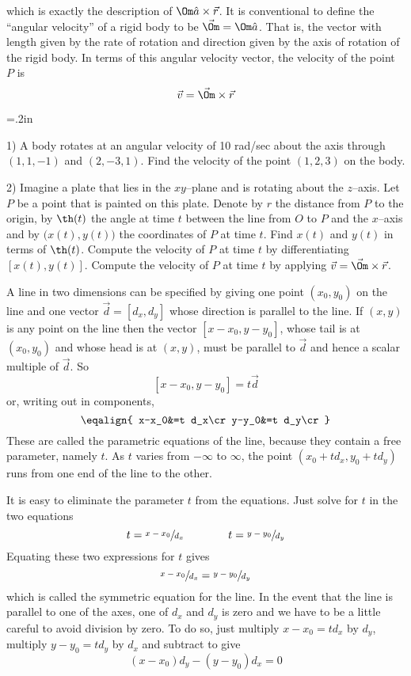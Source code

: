 \goodbreak\noindent
which is exactly the description of $\Om\hat a\times\vec r$. It is conventional
to define the ``angular velocity'' of a rigid body to be $\vec \Om=\Om\hat a$. That
is, the vector with length given by the rate of rotation and direction
given by the axis of rotation of the rigid body. In terms of this angular 
velocity vector, the velocity of the point $P$ is
$$
\vec v=\vec\Om\times\vec r
$$
{\parindent=.2in
\item{1)} A body rotates at an angular velocity of 10 rad/sec about the
axis through $(1,1,-1)$ and $(2,-3,1)$. Find the velocity of the point $(1,2,3)$ on the body.
\smallskip
\item{2)} Imagine a plate that lies in the $xy$--plane and is rotating
about the $z$--axis. Let $P$ be a point that is painted on this plate.
Denote by $r$ the distance from $P$ to the origin, by $\th(t)$ the angle
at time $t$ between the line from $O$ to $P$ and the $x$--axis and by
$\big(x(t),y(t)\big)$ the coordinates of $P$ at time $t$. Find $x(t)$ and
$y(t)$ in terms of $\th(t)$. Compute the velocity of $P$ at time $t$ by
differentiating $[x(t),y(t)]$. Compute the velocity of $P$ at time $t$
by applying $\vec v=\vec \Om\times\vec r$.

}

A line in two dimensions can be specified  by giving one point
$(x_0,y_0)$ on the line and one vector $\vec d=[d_x,d_y]$ whose direction is parallel
to the line.
If $(x,y)$ is any point on the line then the vector $[x-x_0,y-y_0]$, whose tail
is at $(x_0,y_0)$ and whose head is at $(x,y)$,  must be parallel
to $\vec d$ and hence a scalar multiple of $\vec d$. So
$$
[x-x_0,y-y_0]=t \vec d
$$
or, writing out in components,
$$\eqalign{
x-x_0&=t d_x\cr
y-y_0&=t d_y\cr
}$$
These are called the parametric equations of the line, because they contain
a free parameter, namely $t$. As $t$ varies from $-\infty$ to $\infty$,
the point $(x_0+td_x,y_0+td_y)$ runs from one end of the line to the other.

It is easy to eliminate the parameter $t$ from the equations. Just solve
for $t$ in the two equations 
$$
t=\sfrac{x-x_0}{d_x}\qquad\qquad t=\sfrac{y-y_0}{d_y}
$$
Equating these two expressions for $t$ gives 
$$
\sfrac{x-x_0}{d_x}=\sfrac{y-y_0}{d_y}
$$
which is called the symmetric equation for the line. In the event that
the line is parallel to one of the axes, one of $d_x$ and $d_y$ is zero
and we have to be a little careful to avoid division by zero. To do so,
just multiply $x-x_0=t d_x$ by $d_y$, multiply $y-y_0=t d_y$ by $d_x$
and subtract to give
$$
(x-x_0)d_y-(y-y_0)d_x=0
$$

